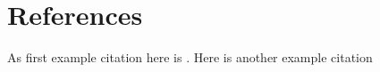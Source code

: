 \documentclass[
11pt, %
english, %
singlespacing, %
headsepline, %
]{MastersDoctoralThesis} %
\begin{document}
\appendix %



%
%
\section*{References}
As first example citation here is \cite{cover_trees}. 
Here is another example citation \cite{sift_lowe}


\printbibliography

\end{document}
